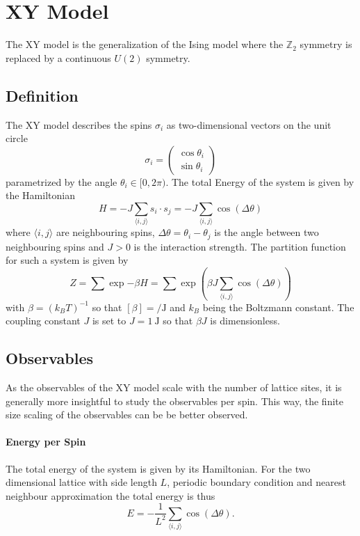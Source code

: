 \section{XY Model}
	The XY model is the generalization of the Ising model where the $\mathbb{Z}_2$ symmetry is replaced by a continuous $U(2)$ symmetry.
	
	\subsection{Definition}
		The XY model describes the spins $\sigma_i$ as two-dimensional vectors on the unit circle
		\begin{equation}\label{eq:hamiltonian}
			\sigma_i = \begin{pmatrix}
				\cos{\theta_i} \\ \sin{\theta_i}
			\end{pmatrix}
		\end{equation}
		parametrized by the angle $\theta_i \in [0,2\pi)$. The total Energy of the system is given by the Hamiltonian
		\begin{equation}
			H = -J \sum_{\langle i, j \rangle}{s_i \cdot s_j} = -J \sum_{\langle i, j \rangle}{\cos(\Delta \theta)}
		\end{equation}
		where $\langle i,j \rangle$ are neighbouring spins, $\Delta \theta = \theta_i - \theta_j$ is the angle between two neighbouring spins and $J>0$ is the interaction strength. The partition function for such a system is given by
		\begin{equation}
			Z = \sum{\exp{-\beta H}} = \sum{\exp{ \left( \beta J \sum_{\langle i, j \rangle}{\cos(\Delta \theta)} \right) }}
		\end{equation}
		with $\beta = (k_B T)^{-1}$ so that $[\beta] = \si{\per\joule}$ and $k_B$ being the Boltzmann constant. The coupling constant $J$ is set to $J = \SI{1}{\joule}$ so that $\beta J$ is dimensionless. 
		
	\subsection{Observables}
		As the observables of the XY model scale with the number of lattice sites, it is generally more insightful to study the observables per spin. This way, the finite size scaling of the observables can be be better observed.
	
		\paragraph{Energy per Spin}
			The total energy of the system is given by its Hamiltonian. For the two dimensional lattice with side length $L$, periodic boundary condition and nearest neighbour approximation the total energy is thus
			\begin{equation}
				E = - \frac{1}{L^2} \sum_{\langle i, j \rangle}{\cos(\Delta \theta)}.
			\end{equation}
		

